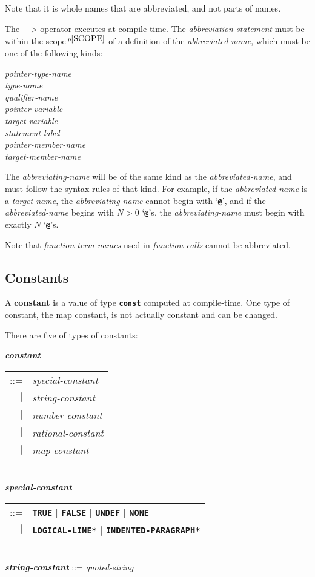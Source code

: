 \documentclass[12pt]{article}
\newcommand{\TT}[1]{{\tt \bfseries #1}}
\newcommand{\ABV}{-{}-{}->}
\newcommand{\key}[1]{{\rm \bfseries #1}}
\newcommand{\ttkey}[1]{{\tt \bfseries #1}}
\newcommand{\emkey}[1]{{\em \bfseries #1}}
\newcommand{\pagnote}[1]{$\,^{p\pageref{#1}}$}
\newenvironment{indpar}[1][0.3in]%
	{\begin{list}{}%
		     {\setlength{\itemsep}{0in}%
		      \setlength{\topsep}{0in}%
		      \setlength{\parsep}{1ex}%
		      \setlength{\labelwidth}{#1}%
		      \setlength{\leftmargin}{#1}%
		      \addtolength{\leftmargin}{\labelsep}}%
	 \item}%
	{\end{list}}
\begin{document}
Note that it is whole names that are abbreviated, and not parts of
names.

The \ABV{} operator executes at compile time.  The {\em abbreviation-statement}
must be within the scope\pagnote{SCOPE}
of a definition of the {\em abbreviated-name},
which must be one of the following kinds:
\begin{center} \em
pointer-type-name \\
type-name \\
qualifier-name \\
pointer-variable \\
target-variable \\
statement-label \\
pointer-member-name \\
target-member-name
\end{center}
The {\em abbreviating-name} will be of the same kind as the
{\em abbreviated-name}, and must follow the syntax rules of that
kind.  For example, if the {\em abbreviated-name}
is a {\em target-name}, the {\em abbreviating-name} cannot begin with
`\TT{@}', and if the {\em abbreviated-name} begins with $N>0$ `\TT{@}'s,
the {\em abbreviating-name} must begin with exactly $N$ `\TT{@}'s.

Note that {\em function-term-names} used in {\em function-calls}
cannot be abbreviated.


\subsection{Constants}
\label{CONSTANTS}

A \key{constant} is a value of type \ttkey{const} computed at
compile-time.  One type of constant, the map constant, is not
actually constant and can be changed.

There are five of types of constants:

\begin{indpar}
\emkey{constant}\label{CONSTANT}
    \begin{tabular}[t]{rl}
    ::= & {\em special-constant} \\
    $|$ & {\em string-constant} \\
    $|$ & {\em number-constant} \\
    $|$ & {\em rational-constant} \\
    $|$ & {\em map-constant} \\
    \end{tabular} \\
\emkey{special-constant}
    \begin{tabular}[t]{@{}rl}
    ::= & \ttkey{TRUE} $|$ \ttkey{FALSE}
                       $|$ \ttkey{UNDEF} $|$ \ttkey{NONE} \\
    $|$ & \ttkey{*LOGICAL-LINE*} $|$ \ttkey{*INDENTED-PARAGRAPH*} \\
    \end{tabular} \\
\emkey{string-constant}\label{STRING-CONSTANT} ::= {\em quoted-string}
\end{indpar}
\end{document}
